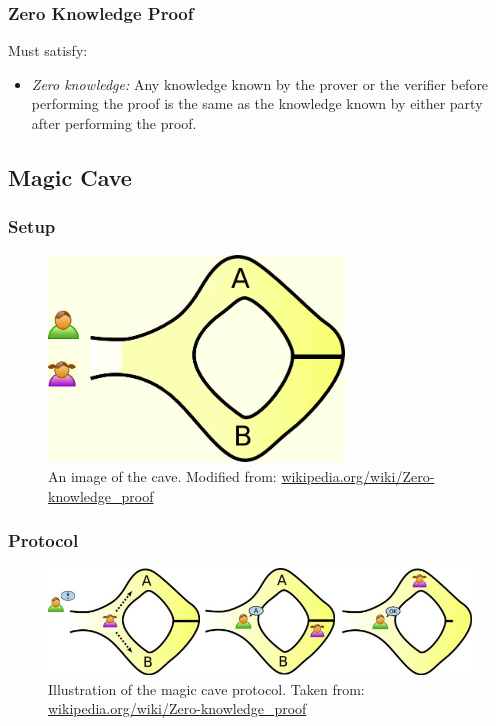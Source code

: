 \documentclass{beamer}
\begin{document}
\begin{frame}
	\frametitle{Zero Knowledge Proof}
	Must satisfy:
	\begin{itemize}
		\item \textit{Zero knowledge:} Any knowledge known by
	the prover or the verifier before performing the proof is the same
	as the knowledge known by either party after performing the proof.		
	\end{itemize}
\end{frame}

\subsection{Magic Cave}

\begin{frame}
	\frametitle{Setup}
	\begin{figure}
	\centering
	\includegraphics[width=0.70\textwidth]{MagicCave0.jpg}
	\caption{An image of the cave. \linebreak Modified from: \url{wikipedia.org/wiki/Zero-knowledge_proof}}
	\label{fig:MCave}
	\end{figure}
	
\end{frame}

\begin{frame}
	\frametitle{Protocol}

	\begin{figure}
	\centering
	\includegraphics[width=1.00\textwidth]{MagicCave.jpg}
	\caption{Illustration of the magic cave protocol. \linebreak Taken from: \url{wikipedia.org/wiki/Zero-knowledge_proof}}
	\label{fig:MCave}
	\end{figure}
	
\end{frame}
\end{document}
